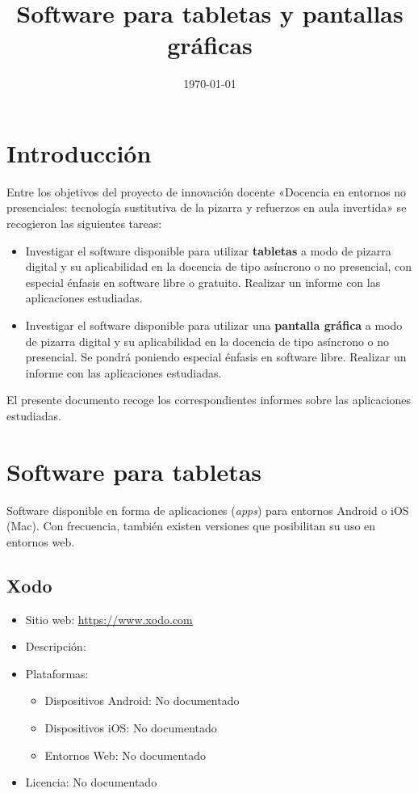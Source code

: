 \documentclass[11pt]{article}
\title{Software para tabletas y pantallas gráficas}
\date{\today}
\newcommand{\nodoc}{No documentado}
\begin{document}
\maketitle

\section{Introducción}
Entre los objetivos del proyecto de innovación docente «Docencia en
entornos no presenciales: tecnología sustitutiva de la pizarra y
refuerzos en aula invertida» se recogieron las siguientes tareas:

\begin{itemize}
\item Investigar el software disponible para utilizar
  \textbf{tabletas} a modo de pizarra digital y su aplicabilidad en la
  docencia de tipo asíncrono o no presencial, con especial énfasis en
  software libre o gratuito. Realizar un informe con las aplicaciones
  estudiadas.

\item Investigar el software disponible para utilizar una \textbf{pantalla
  gráfica} a modo de pizarra digital y su aplicabilidad en la docencia
  de tipo asíncrono o no presencial. Se pondrá poniendo especial
  énfasis en software libre. Realizar un informe con las aplicaciones
  estudiadas.
\end{itemize}

El presente documento recoge los correspondientes informes sobre las aplicaciones estudiadas.

\section{Software para tabletas}

Software disponible en forma de aplicaciones (\textit{apps}) para
entornos Android o iOS (Mac). Con frecuencia, también existen
versiones que posibilitan su uso en entornos web.

\subsection{Xodo}

\begin{itemize}
\item Sitio web: \url{https://www.xodo.com}
\item Descripción:
\item Plataformas:
  \begin{itemize}
  \item Dispositivos Android: \nodoc
  \item Dispositivos iOS: \nodoc
  \item Entornos Web: \nodoc
  \end{itemize}
\item Licencia: \nodoc
\end{itemize}
\end{document}
